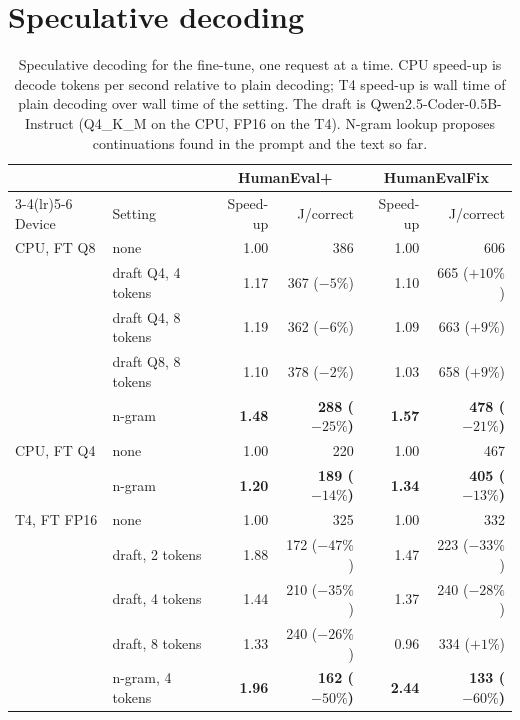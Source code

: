 \documentclass[11pt]{article}
\begin{document}
\section{Speculative decoding}
\label{sec:spec}

\begin{table}[t]
\centering
\small
\begin{tabular}{llrrrr}
\toprule
 & & \multicolumn{2}{c}{HumanEval+} & \multicolumn{2}{c}{HumanEvalFix} \\
\cmidrule(lr){3-4}\cmidrule(lr){5-6}
Device & Setting & Speed-up & J/correct & Speed-up & J/correct \\
\midrule
CPU, FT Q8 & none & 1.00 & 386 & 1.00 & 606 \\
 & draft Q4, 4 tokens & 1.17 & 367 ($-5\%$) & 1.10 & 665 ($+10\%$) \\
 & draft Q4, 8 tokens & 1.19 & 362 ($-6\%$) & 1.09 & 663 ($+9\%$) \\
 & draft Q8, 8 tokens & 1.10 & 378 ($-2\%$) & 1.03 & 658 ($+9\%$) \\
 & n-gram & \textbf{1.48} & \textbf{288 ($-25\%$)} & \textbf{1.57} & \textbf{478 ($-21\%$)} \\
\midrule
CPU, FT Q4 & none & 1.00 & 220 & 1.00 & 467 \\
 & n-gram & \textbf{1.20} & \textbf{189 ($-14\%$)} & \textbf{1.34} & \textbf{405 ($-13\%$)} \\
\midrule
T4, FT FP16 & none & 1.00 & 325 & 1.00 & 332 \\
 & draft, 2 tokens & 1.88 & 172 ($-47\%$) & 1.47 & 223 ($-33\%$) \\
 & draft, 4 tokens & 1.44 & 210 ($-35\%$) & 1.37 & 240 ($-28\%$) \\
 & draft, 8 tokens & 1.33 & 240 ($-26\%$) & 0.96 & 334 ($+1\%$) \\
 & n-gram, 4 tokens & \textbf{1.96} & \textbf{162 ($-50\%$)} & \textbf{2.44} & \textbf{133 ($-60\%$)} \\
\bottomrule
\end{tabular}
\caption{Speculative decoding for the fine-tune, one request at a time. CPU speed-up is decode
tokens per second relative to plain decoding; T4 speed-up is wall time of plain decoding over
wall time of the setting. The draft is Qwen2.5-Coder-0.5B-Instruct (Q4\_K\_M on the CPU, FP16 on
the T4). N-gram lookup proposes continuations found in the prompt and the text so far.}
\label{tab:spec}
\end{table}
\end{document}

